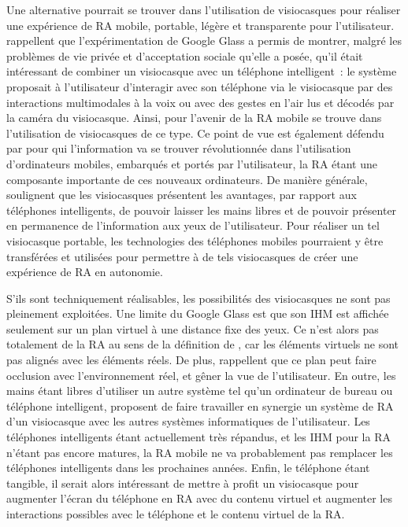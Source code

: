 Une alternative pourrait se trouver dans l'utilisation de visiocasques pour réaliser une expérience de RA mobile, portable, légère et transparente pour l'utilisateur. \citet{KoelleKranzMoeller2015} rappellent que l'expérimentation de Google Glass a permis de montrer, malgré les problèmes de vie privée et d'acceptation sociale qu'elle a posée, qu'il était intéressant de combiner un visiocasque avec un téléphone intelligent~: le système proposait à l'utilisateur d'interagir avec son téléphone via le visiocasque par des interactions multimodales à la voix ou avec des gestes en l'air lus et décodés par la caméra du visiocasque. Ainsi, pour \citet{HuangHuiPeyloEtAl2013} l'avenir de la RA mobile se trouve dans l'utilisation de visiocasques de ce type. Ce point de vue est également défendu par \citet{SwanGabbard2005} pour qui l'information va se trouver révolutionnée dans l'utilisation d'ordinateurs mobiles, embarqués et portés par l'utilisateur, la RA étant une composante importante de ces nouveaux ordinateurs. De manière générale, \citet{SerranoEnsYangEtAl2015} soulignent que les visiocasques présentent les avantages, par rapport aux téléphones intelligents, de pouvoir laisser les mains libres et de pouvoir présenter en permanence de l'information aux yeux de l'utilisateur. Pour réaliser un tel visiocasque portable, les technologies des téléphones mobiles pourraient y être transférées et utilisées pour permettre à de tels visiocasques de créer une expérience de RA en autonomie.

S'ils sont techniquement réalisables, les possibilités des visiocasques ne sont pas pleinement exploitées. Une limite du Google Glass est que son IHM est affichée seulement sur un plan virtuel à une distance fixe des yeux. Ce n'est alors pas totalement de la RA au sens de la définition de \citet{AzumaBaillotBehringerEtAl2001}, car les éléments virtuels ne sont pas alignés avec les éléments réels. De plus, \citet{SerranoEnsYangEtAl2015} rappellent que ce plan peut faire occlusion avec l'environnement réel, et gêner la vue de l'utilisateur. En outre, les mains étant libres d'utiliser un autre système tel qu'un ordinateur de bureau ou téléphone intelligent, \citet{SerranoEnsYangEtAl2015b} proposent de faire travailler en synergie un système de RA d'un visiocasque avec les autres systèmes informatiques de l'utilisateur. Les téléphones intelligents étant actuellement très répandus, et les IHM pour la RA n'étant pas encore matures, la RA mobile ne va probablement pas remplacer les téléphones intelligents dans les prochaines années. Enfin, le téléphone étant tangible, il serait alors intéressant de mettre à profit un visiocasque pour augmenter l'écran du téléphone en RA avec du contenu virtuel et augmenter les interactions possibles avec le téléphone et le contenu virtuel de la RA. 

